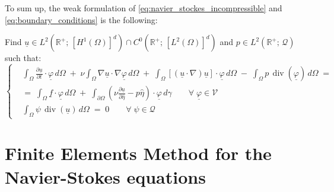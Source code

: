 \documentclass[11pt,a4paper]{article}
\newcommand{\R}{\mathds{R}}
\renewcommand{\vec}[1]{\underline{#1}} %
\let\oldforall\forall
\renewcommand{\forall}{\oldforall \; }
\DeclareMathOperator{\Div}{div}
\begin{document}
To sum up, the weak formulation of \eqref{eq:navier_stockes_incompressible} and \eqref{eq:boundary_conditions} is the following: 
\begin{tcolorbox}[colback = bluePoli!10, colframe=bluePoli]
    Find $\vec{u} \in L^{2}\left(\R^{+}; \, \left[H^{1}(\Omega) \right]^{d} \right) \cap C^{0}\left(\R^{+}; \, \left[L^{2}(\Omega) \right]^{d} \right)$ and $p \in L^{2}\left( \R^{+}; \, \mathcal{Q} \right)$ such that: 
    \begin{equation}
    \label{eq:weak_formulation}
        \left\{ \begin{aligned}
                            &\int_{\Omega} \frac{\partial \vec{u}}{\partial t} \cdot \vec{\varphi} \,  d\Omega \; + \; \nu \int_{\Omega} \nabla \vec{u} \cdot \nabla \vec{\varphi}  \, d\Omega \; + \; \int_{\Omega} [ (\vec{u} \cdot \nabla) \vec{u}] \cdot \vec{\varphi} \, d\Omega \; - \; \int_{\Omega} p \, \Div \left( \vec{\varphi} \right) \, d\Omega \; = \\
                            &= \; \int_{\Omega} \vec{f} \cdot \vec{\varphi} \, d\Omega \; + \; \int_{\partial \Omega} \left( \nu \frac{\partial \vec{u}}{\partial \hat{\eta}} - p \hat{\eta} \right) \cdot \vec{\varphi}  \, d\gamma \qquad \forall \vec{\varphi} \in \mathcal{V} \\
                            &\int_{\Omega} \psi \, \Div(\vec{u}) \, d \Omega \; = \; 0 \qquad \forall \psi \in \mathcal{Q}
                \end{aligned} \right.
    \end{equation}
\end{tcolorbox}

\section{Finite Elements Method for the Navier-Stokes equations}
\end{document}
